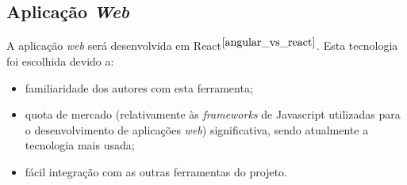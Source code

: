 \subsection{Aplicação \textit{Web}}
A aplicação \textit{web} será desenvolvida em React$^{\cite{angular_vs_react}}$. Esta tecnologia foi escolhida devido a:

\begin{itemize}
	\item familiaridade dos autores com esta ferramenta;
	\item quota de mercado (relativamente às \textit{frameworks} de Javascript utilizadas para o desenvolvimento de aplicações \textit{web}) significativa, sendo atualmente a tecnologia mais usada;
	\item fácil integração com as outras ferramentas do projeto.
\end{itemize}

